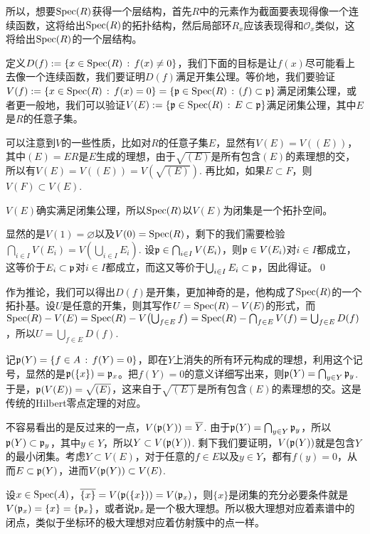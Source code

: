 所以，想要$\operatorname{Spec}(R)$获得一个层结构，首先$R$中的元素作为截面要表现得像一个连续函数，这将给出$\operatorname{Spec}(R)$的拓扑结构，然后局部环$R_x$应该表现得和$\mathcal{O}_x$类似，这将给出$\operatorname{Spec}(R)$的一个层结构。

\para 定义$D(f):=\{x\in \operatorname{Spec}(R)\,:\, f(x)\neq 0\}$，我们下面的目标是让$f(x)$尽可能看上去像一个连续函数，我们要证明$D(f)$满足开集公理。等价地，我们要验证$V(f):=\{x\in \operatorname{Spec}(R)\,:\, f(x)=0\}=\{\mathfrak{p}\in \operatorname{Spec}(R)\,:\, (f)\subset \mathfrak{p}\}$满足闭集公理，或者更一般地，我们可以验证$V(E):=\{\mathfrak{p}\in \operatorname{Spec}(R)\,:\, E\subset \mathfrak{p}\}$满足闭集公理，其中$E$是$R$的任意子集。

可以注意到$V$的一些性质，比如对$R$的任意子集$E$，显然有$V(E)=V((E))$，其中$(E)=ER$是$E$生成的理想，由于$\sqrt{(E)}$是所有包含$(E)$的素理想的交，所以有$V(E)=V((E))=V(\sqrt{(E)})$. 再比如，如果$E\subset F$，则$V(F)\subset V(E)$.

\pro $V(E)$确实满足闭集公理，所以$\operatorname{Spec}(R)$以$V(E)$为闭集是一个拓扑空间。

\proof 显然的是$V(1)=\varnothing$以及$V(0)=\operatorname{Spec}(R)$，剩下的我们需要检验$\bigcap_{i\in I}V(E_i)=V(\bigcup_{i\in I}E_i)$. 设$\mathfrak{p} \in \bigcap_{i\in I}V(E_i)$，则$\mathfrak{p}\in V(E_i)$对$i\in I$都成立，这等价于$E_i\subset \mathfrak{p}$对$i\in I$都成立，而这又等价于$\bigcup_{i\in I}E_i \subset \mathfrak{p}$，因此得证。\qed

作为推论，我们可以得出$D(f)$是开集，更加神奇的是，他构成了$\operatorname{Spec}(R)$的一个拓扑基。设$U$是任意的开集，则其写作$U=\operatorname{Spec}(R)-V(E)$的形式，而$\operatorname{Spec}(R)-V(E)=\operatorname{Spec}(R)-V\bigl(\bigcup_{f\in E} f\bigr)=\operatorname{Spec}(R)-\bigcap_{f\in E}V(f)=\bigcup_{f\in E}D(f)$，所以$U=\bigcup_{f\in E}D(f)$.

\para 记$\mathfrak{p}(Y)=\{f\in A\,:\, f(Y)=0\}$，即在$Y$上消失的所有环元构成的理想，利用这个记号，显然的是$\mathfrak{p}(\{x\})=\mathfrak{p}_x$。把$f(Y)=0$的意义详细写出来，则$\mathfrak{p}(Y)=\bigcap_{y\in Y}\mathfrak{p}_y$. 于是，$\mathfrak{p}(V(E))=\sqrt{(E)}$，这来自于$\sqrt{(E)}$是所有包含$(E)$的素理想的交。这是传统的Hilbert零点定理的对应。

不容易看出的是反过来的一点，$V(\mathfrak{p}(Y))=\overline{Y}$. 由于$\mathfrak{p}(Y)=\bigcap_{y\in Y}\mathfrak{p}_y$，所以$\mathfrak{p}(Y) \subset \mathfrak{p}_y$，其中$y\in Y$，所以$Y\subset V(\mathfrak{p}(Y))$. 剩下我们要证明，$V(\mathfrak{p}(Y))$就是包含$Y$的最小闭集。考虑$Y\subset V(E)$，对于任意的$f\in E$以及$y\in Y$，都有$f(y)=0$，从而$E\subset \mathfrak{p}(Y)$，进而$V(\mathfrak{p}(Y))\subset V(E)$. 

\para 设$x\in \operatorname{Spec}(A)$，$\overline{\{x\}}=V(\mathfrak{p}(\{x\}))=V(\mathfrak{p}_x)$，则$\{x\}$是闭集的充分必要条件就是$V(\mathfrak{p}_x)=\{x\}=\{\mathfrak{p}_x\}$，或者说$\mathfrak{p}_x$是一个极大理想。所以极大理想对应着素谱中的闭点，类似于坐标环的极大理想对应着仿射簇中的点一样。

